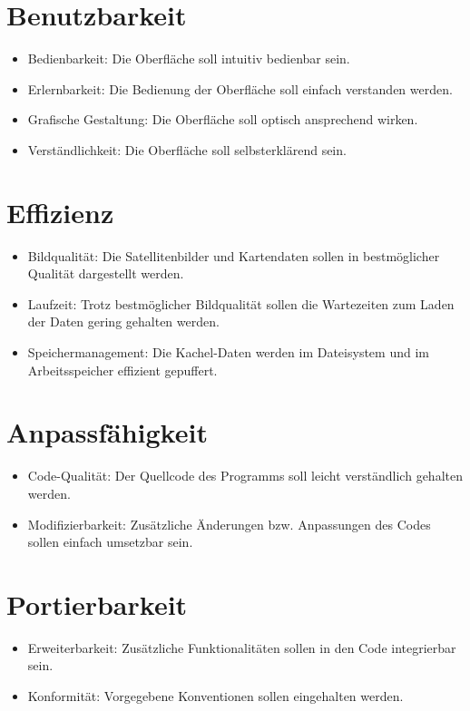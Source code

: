 \documentclass[10pt]{scrreprt}
\begin{document}
\section{Benutzbarkeit}
\begin{itemize}
\item Bedienbarkeit: Die Oberfläche soll intuitiv bedienbar sein.
\item Erlernbarkeit: Die Bedienung der Oberfläche soll einfach verstanden werden.
\item Grafische Gestaltung: Die Oberfläche soll optisch ansprechend wirken.
\item Verständlichkeit: Die Oberfläche soll selbsterklärend sein.
\end{itemize}


\section{Effizienz}
\begin{itemize}
\item Bildqualität: Die Satellitenbilder und Kartendaten sollen in bestmöglicher Qualität dargestellt werden.
\item Laufzeit: Trotz bestmöglicher Bildqualität sollen die Wartezeiten zum Laden der Daten gering gehalten werden.
\item Speichermanagement: Die Kachel-Daten werden im Dateisystem und im Arbeitsspeicher effizient gepuffert.
\end{itemize}


\section{Anpassfähigkeit}
\begin{itemize}
\item Code-Qualität: Der Quellcode des Programms soll leicht verständlich gehalten werden.
\item Modifizierbarkeit: Zusätzliche Änderungen bzw. Anpassungen des Codes sollen einfach umsetzbar sein.
\end{itemize}


\section{Portierbarkeit}
\begin{itemize}
\item Erweiterbarkeit: Zusätzliche Funktionalitäten sollen in den Code integrierbar sein.
\item Konformität: Vorgegebene Konventionen sollen eingehalten werden.
\end{itemize}
\end{document}
